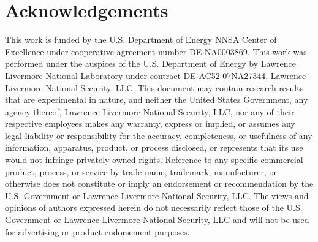 \documentclass[%
 aip,
 amsmath,amssymb,
 reprint,
 floatfix
]{revtex4-1}
\begin{document}






\section{Acknowledgements}
This work is funded by the U.S. Department of Energy NNSA Center of Excellence under cooperative agreement number DE-NA0003869. This work was performed under the auspices of the U.S. Department of Energy by Lawrence Livermore National Laboratory under contract DE-AC52-07NA27344. Lawrence Livermore National Security, LLC.  This document may contain research results that are experimental in nature, and neither the United States Government, any agency thereof, Lawrence Livermore National Security, LLC, nor any of their respective employees makes any warranty, express or implied, or assumes any legal liability or responsibility for the accuracy, completeness, or usefulness of any information, apparatus, product, or process disclosed, or represents that its use would not infringe privately owned rights. Reference to any specific commercial product, process, or service by trade name, trademark, manufacturer, or otherwise does not constitute or imply an endorsement or recommendation by the U.S. Government or Lawrence Livermore National Security, LLC. The views and opinions of authors expressed herein do not necessarily reflect those of the U.S. Government or Lawrence Livermore National Security, LLC and will not be used for advertising or product endorsement purposes.




  		
 
\end{document}
